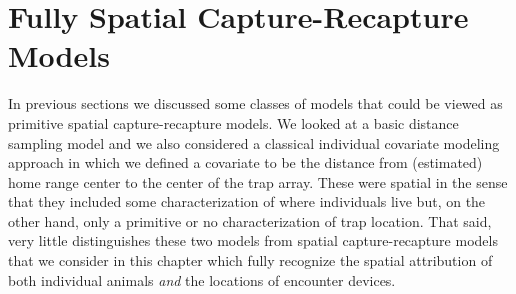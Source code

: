 







\chapter{Fully Spatial Capture-Recapture Models}
\label{chapt.scr0}

\vspace{.3in}

In previous sections we discussed some classes of models that could be
viewed as primitive spatial capture-recapture models. We looked at a
basic distance sampling model and we also considered a classical
individual covariate modeling approach in which we defined a covariate
to be the distance from (estimated) home range center to the center of
the trap array. These were spatial in the sense that they included
some characterization of where individuals live but, on the other
hand, only a primitive or no characterization of trap location.  That
said, very little distinguishes these two models from spatial
capture-recapture models that we consider in this chapter which fully
recognize the spatial attribution of both individual animals {\it and}
the locations of encounter devices.

